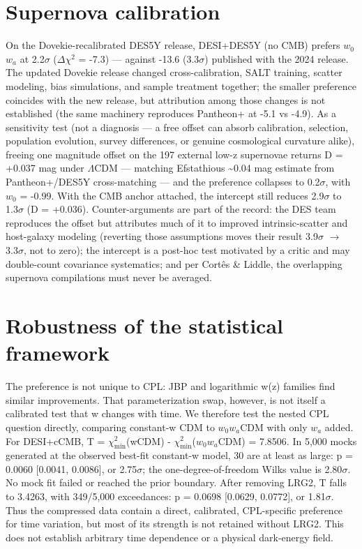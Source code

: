 \documentclass[aps,prd,preprint,superscriptaddress,nofootinbib]{revtex4-2}
\begin{document}
\section{Supernova calibration}\label{supernova-calibration}

On the Dovekie-recalibrated DES5Y release, DESI+DES5Y (no CMB) prefers
\(w_0\)\(w_a\) at 2.2\(\sigma\) (\(\Delta\chi^2\) = -7.3) --- against
-13.6 (3.3\(\sigma\)) published with the 2024 release. The updated
Dovekie release changed cross-calibration, SALT training, scatter
modeling, bias simulations, and sample treatment together; the smaller
preference coincides with the new release, but attribution among those
changes is not established (the same machinery reproduces Pantheon+ at
-5.1 vs -4.9). As a sensitivity test (not a diagnosis --- a free offset
can absorb calibration, selection, population evolution, survey
differences, or genuine cosmological curvature alike), freeing one
magnitude offset on the 197 external low-z supernovae returns D = +0.037
mag under \(\Lambda\)CDM --- matching Efstathiou\textquotesingle s
\textasciitilde0.04 mag estimate from Pantheon+/DES5Y cross-matching ---
and the preference collapses to 0.2\(\sigma\), with \(w_0\) = -0.99.
With the CMB anchor attached, the intercept still reduces 2.9\(\sigma\)
to 1.3\(\sigma\) (D = +0.036). Counter-arguments are part of the record:
the DES team reproduces the offset but attributes much of it to improved
intrinsic-scatter and host-galaxy modeling (reverting those assumptions
moves their result 3.9\(\sigma\) \(\rightarrow\) 3.3\(\sigma\), not to
zero); the intercept is a post-hoc test motivated by a critic and may
double-count covariance systematics; and per Cort\^{e}s \& Liddle, the
overlapping supernova compilations must never be averaged.

\section{Robustness of the statistical
framework}\label{robustness-of-the-statistical-framework}

The preference is not unique to CPL: JBP and logarithmic w(z) families
find similar improvements. That parameterization swap, however, is not
itself a calibrated test that w changes with time. We therefore test the
nested CPL question directly, comparing constant-w CDM to \(w_0w_a\)CDM
with only \(w_a\) added. For DESI+cCMB, T = \(\chi^2_{\min}\)(wCDM) -
\(\chi^2_{\min}\)(\(w_0w_a\)CDM) = 7.8506. In 5,000 mocks generated at
the observed best-fit constant-w model, 30 are at least as large: p =
0.0060 {[}0.0041, 0.0086{]}, or 2.75\(\sigma\); the
one-degree-of-freedom Wilks value is 2.80\(\sigma\). No mock fit failed
or reached the prior boundary. After removing LRG2, T falls to 3.4263,
with 349/5,000 exceedances: p = 0.0698 {[}0.0629, 0.0772{]}, or
1.81\(\sigma\). Thus the compressed data contain a direct, calibrated,
CPL-specific preference for time variation, but most of its strength is
not retained without LRG2. This does not establish arbitrary time
dependence or a physical dark-energy field.
\end{document}
